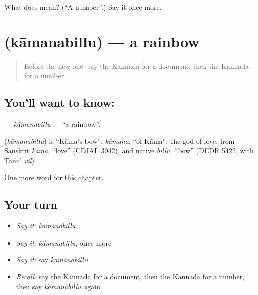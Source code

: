 \begin{tcolorbox}[breakable,colback=teal!4,colframe=teal!35!black,title={Before you move on}]
What does  mean? (\textquotedblleft{}A number\textquotedblright{}.) Say it once more.
\end{tcolorbox}
\section[\texorpdfstring{\kn{ಕಾಮನಬಿಲ್ಲು} (kāmanabillu)}{ಕಾಮನಬಿಲ್ಲು (kāmanabillu)}]{ (kāmanabillu) — a rainbow}

\label{lesson:KA-C187-kamanabillu}



\begin{quote}
Before the new one: say the Kannada for a document, then the Kannada for a number.
\end{quote}

\subsection*{You'll want to know: }
\textbf{} — \emph{kāmanabillu} — \textquotedblleft{}a rainbow\textquotedblright{}.

\begin{cousinweb}
\textbf{} (\emph{kāmanabillu}) is \textquotedblleft{}Kāma's bow\textquotedblright{}: \emph{kāmana}, \textquotedblleft{}of Kāma\textquotedblright{}, the god of love, from Sanskrit \emph{kāma}, \textquotedblleft{}love\textquotedblright{} (CDIAL 3042), and native \emph{billu}, \textquotedblleft{}bow\textquotedblright{} (DEDR 5422, with Tamil \emph{vil}).
\end{cousinweb}

\begin{grammarlens}[title={What you've built}]
One more word for this chapter.
\end{grammarlens}

\subsection*{Your turn}
\begin{itemize}
\raggedright
  \item \emph{Say it:} \emph{kāmanabillu}
  \item \emph{Say it:} \emph{kāmanabillu}, once more
  \item \emph{Say it:} say \emph{kāmanabillu}
  \item \emph{Recall:} say the Kannada for a document, then the Kannada for a number, then say \emph{kāmanabillu} again
\end{itemize}

